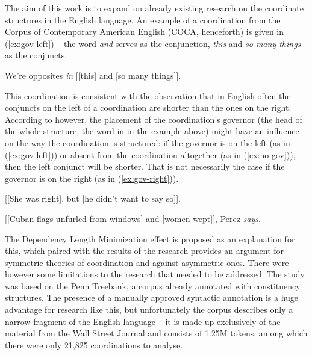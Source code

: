 The aim of this work is to expand on already existing research on the coordinate structures in the English language. An example of a coordination from the Corpus of Contemporary American English \citep{coca} (COCA, henceforth) is given in (\ref{ex:gov-left}) -- the word \textsl{and} serves as the conjunction, \textsl{this} and \textsl{so many things} as the conjuncts.

\begin{exe}
    \ex\label{ex:gov-left}
    We're opposites \textsl{in} [[this] and [so many things]].
\end{exe}

This coordination is consistent with the observation that in English often the conjuncts on the left of a coordination are shorter than the ones on the right. According to \cite{prz:woz:23} however, the placement of the coordination's governor (the head of the whole structure, the word in in the example above) might have an influence on the way the coordination is structured: if the governor is on the left (as in (\ref{ex:gov-left})) or absent from the coordination altogether (as in (\ref{ex:no-gov})), then the left conjunct will be shorter. That is not necessarily the case if the governor is on the right (as in (\ref{ex:gov-right})).

\begin{exe}
    \ex\label{ex:no-gov}
    [[She was right], but [he didn't want to say so]].
\end{exe}

\begin{exe}
    \ex\label{ex:gov-right}
    [[Cuban flags unfurled from windows] and [women wept]], Perez \textsl{says}.
\end{exe}

The Dependency Length Minimization effect is proposed as an explanation for this, which paired with the results of the research provides an argument for symmetric theories of coordination and against asymmetric ones. There were however some limitations to the research that needed to be addressed. The study was based on the Penn Treebank, a corpus already annotated with constituency structures. The presence of a manually approved syntactic annotation is a huge advantage for research like this, but unfortunately the corpus describes only a narrow fragment of the English language -- it is made up exclusively of the material from the Wall Street Journal and consists of 1.25M tokens, among which there were only 21,825 coordinations to analyse.

